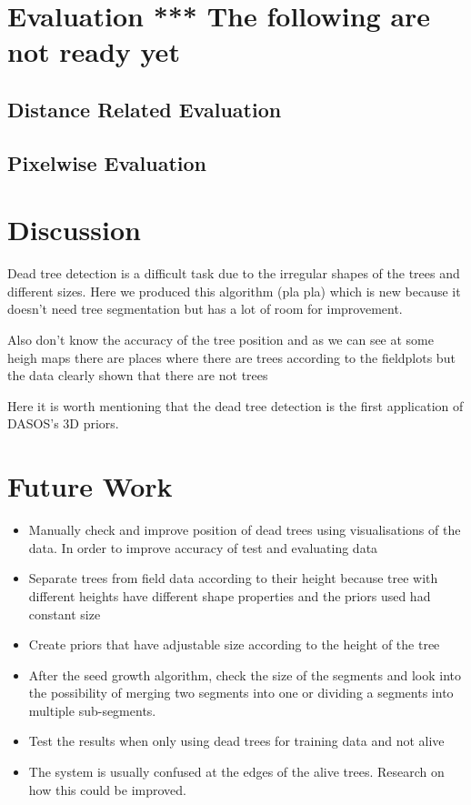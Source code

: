 \documentclass{subfiles}
\begin{document}
 


\newpage\newpage\newpage
\section{Evaluation {\color{red} *** The following are not ready yet}} 


   \subsection{Distance Related Evaluation}


   \subsection{Pixelwise Evaluation}
		
		
\section{Discussion}

\par Dead tree detection is a difficult task due to the irregular shapes of the trees and different sizes. Here we produced this algorithm (pla pla) which is new because it doesn't need tree segmentation but has a lot of room for improvement. 

Also don't know the accuracy of the tree position and as we can see at some heigh maps there are places where there are trees according to the fieldplots but the data clearly shown that there are not trees



\par Here it is worth mentioning that the dead tree detection is the first application of DASOS's 3D priors. 

\section{Future Work}

\begin{itemize}
	\item Manually check and improve position of dead trees using visualisations of the data. In order to improve accuracy of test and evaluating data
	\item Separate trees from field data according to their height because tree with different heights have different shape properties and the priors used had constant size
	\item Create priors that have adjustable size according to the height of the tree	
	\item After the seed growth algorithm, check the size of the segments and look into the possibility of merging two segments into one or dividing a segments into multiple sub-segments.
	\item Test the results when only using dead trees for training data and not alive
	\item The system is usually confused at the edges of the alive trees. Research on how this could be improved. 
\end{itemize}
\end{document}
